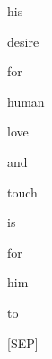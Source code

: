 \documentclass[varwidth=150mm]{standalone}
\begin{document}
\begin{CJK*}{UTF8}{gbsn}
{{{\colorbox{red!5.008548259735107}{\strut his} \colorbox{red!2.2380099296569824}{\strut desire} \colorbox{red!0.0}{\strut for} \colorbox{red!6.716955661773682}{\strut human} \colorbox{red!2.4947521686553955}{\strut love} \colorbox{red!1.033705472946167}{\strut and} \colorbox{red!2.384033679962158}{\strut touch} \colorbox{red!8.965431213378906}{\strut is} \colorbox{red!3.882631778717041}{\strut for} \colorbox{red!8.959961891174316}{\strut him} \colorbox{red!50.27830505371094}{\strut to} \colorbox{red!1.4349517822265625}{\strut [SEP]}
}}}
\end{CJK*}
\end{document}
